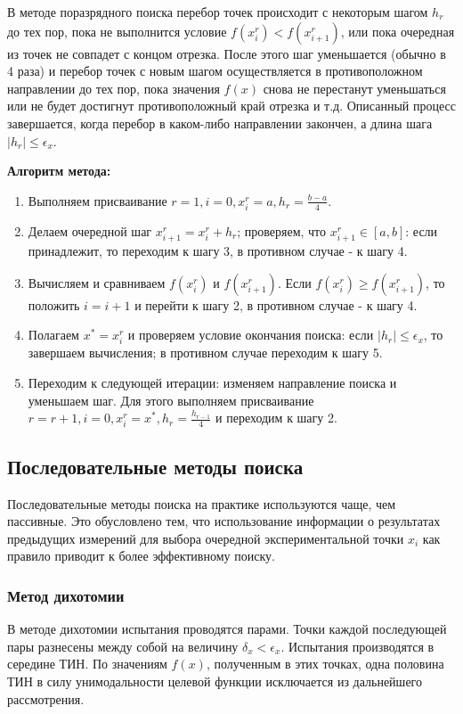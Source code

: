 \documentclass[a4paper,12pt]{report}
\begin{document}
В методе поразрядного поиска перебор точек происходит с некоторым шагом $h_{r}$ до тех пор, пока не выполнится условие $f(x^{r}_{i}) < f(x^{r}_{i+1})$, или пока очередная из точек не совпадет с концом отрезка. После этого шаг уменьшается (обычно в 4 раза) и перебор точек с новым шагом осуществляется в противоположном направлении до тех пор, пока значения $f(x)$ снова не перестанут уменьшаться или не будет достигнут противоположный край отрезка и т.д. Описанный процесс завершается, когда перебор в каком-либо направлении закончен, а длина шага $\left|h_{r}\right| \leq \epsilon_{x}$.

\textbf{Алгоритм метода:}
\begin{enumerate}
\item Выполняем присваивание $r = 1, i = 0, x^{r}_{i} = a, h_{r} = \frac{b-a}{4}$.
\item Делаем очередной шаг $x^{r}_{i+1} = x^{r}_{i} + h_{r}$; проверяем, что $x^{r}_{i+1} \in \left[a, b\right]$: если принадлежит, то переходим к шагу 3, в противном случае - к шагу 4.
\item Вычисляем и сравниваем $f(x^{r}_{i})$ и $f(x^{r}_{i+1})$. Если $f(x^{r}_{i}) \geq f(x^{r}_{i+1})$, то положить $i = i + 1$ и перейти к шагу 2, в противном случае - к шагу 4.
\item Полагаем $x^{*} = x^{r}_{i}$ и проверяем условие окончания поиска: если $\left|h_{r}\right| \leq \epsilon_{x}$, то завершаем вычисления; в противном случае переходим к шагу 5.
\item Переходим к следующей итерации: изменяем направление поиска и уменьшаем шаг. Для этого выполняем присваивание $r = r + 1, i = 0, x^{r}_{i} = x^{*}, h_{r} = \frac{h_{r-1}}{4}$ и переходим к шагу 2.
\end{enumerate}

\subsection{Последовательные методы поиска}
\label{sec:PosledSearch}
Последовательные методы поиска на практике используются чаще, чем пассивные. Это обусловлено тем, что использование информации о результатах предыдущих измерений для выбора очередной экспериментальной точки $x_{i}$ как правило приводит к более эффективному поиску.

\subsubsection{Метод дихотомии}
В методе дихотомии испытания проводятся парами. Точки каждой последующей пары разнесены между собой на величину $\delta_{x} < \epsilon_{x}$. Испытания производятся в середине ТИН. По значениям $f(x)$, полученным в этих точках, одна половина ТИН в силу унимодальности целевой функции исключается из дальнейшего рассмотрения.
\end{document}
